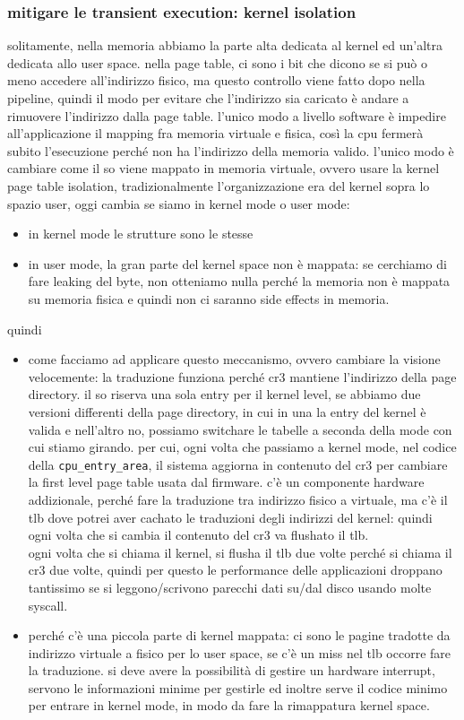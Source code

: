 \documentclass[12pt, oneside]{extbook} %
\begin{document}
\subsubsection{mitigare le transient execution: kernel isolation}
solitamente, nella memoria abbiamo la parte alta dedicata al kernel ed un'altra dedicata allo user space. nella page table, ci sono i bit che dicono se si può o meno accedere all'indirizzo fisico, ma questo controllo viene fatto dopo nella pipeline, quindi il modo per evitare che l'indirizzo sia caricato è andare a rimuovere l'indirizzo dalla page table. l'unico modo a livello software è impedire all'applicazione il mapping fra memoria virtuale e fisica, così la cpu fermerà subito l'esecuzione perché non ha l'indirizzo della memoria valido. l'unico modo è cambiare come il so viene mappato in memoria virtuale, ovvero usare la kernel page table isolation, tradizionalmente l'organizzazione era del kernel sopra lo spazio user, oggi cambia se siamo in kernel mode o user mode:
\begin{itemize}
\item in kernel mode le strutture sono le stesse
\item in user mode, la gran parte del kernel space non è mappata: se cerchiamo di fare leaking del byte, non otteniamo nulla perché la memoria non è mappata su memoria fisica e quindi non ci saranno side effects in memoria.
\end{itemize}
quindi
\begin{itemize}
\item come facciamo ad applicare questo meccanismo, ovvero cambiare la visione velocemente: la traduzione funziona perché cr3 mantiene l'indirizzo della page directory. il so riserva una sola entry per il kernel level, se abbiamo due versioni differenti della page directory, in cui in una la entry del kernel è valida e nell'altro no, possiamo switchare le tabelle a seconda della mode con cui stiamo girando. per cui, ogni volta che passiamo a kernel mode, nel codice della \texttt{cpu\_entry\_area}, il sistema aggiorna in contenuto del cr3 per cambiare la first level page table usata dal firmware. c'è un componente hardware addizionale, perché fare la traduzione tra indirizzo fisico a virtuale, ma c'è il tlb dove potrei aver cachato le traduzioni degli indirizzi del kernel: quindi ogni volta che si cambia il contenuto del cr3 va flushato il tlb.\\ogni volta che si chiama il kernel, si flusha il tlb due volte perché si chiama il cr3 due volte, quindi per questo le performance delle applicazioni droppano tantissimo se si leggono/scrivono parecchi dati su/dal disco usando molte syscall.
\item perché c'è una piccola parte di kernel mappata: ci sono le pagine tradotte da indirizzo virtuale a fisico per lo user space, se c'è un miss nel tlb occorre fare la traduzione. si deve avere la possibilità di gestire un hardware interrupt, servono le informazioni minime per gestirle ed inoltre serve il codice minimo per entrare in kernel mode, in modo da fare la rimappatura kernel space.
\end{itemize}
\end{document}
